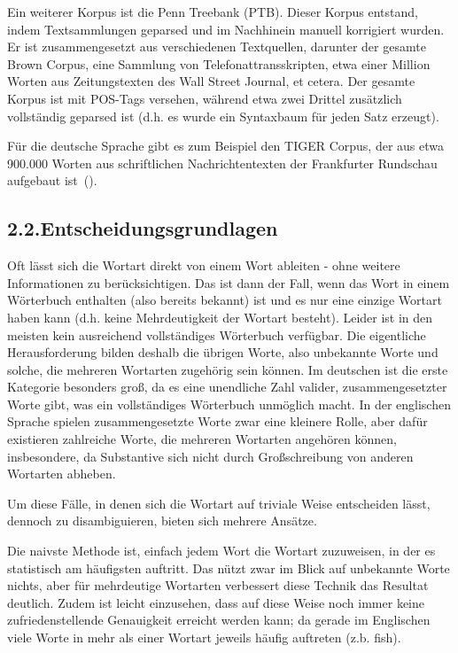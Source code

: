 \documentclass{article}
\begin{document}
Ein weiterer Korpus ist die Penn Treebank (PTB). Dieser Korpus entstand, indem Textsammlungen geparsed und im Nachhinein manuell korrigiert wurden. Er ist zusammengesetzt aus verschiedenen Textquellen, darunter der gesamte Brown Corpus, eine Sammlung von Telefonattransskripten, etwa einer Million Worten aus Zeitungstexten des Wall Street Journal, et cetera. Der gesamte Korpus ist mit POS-Tags versehen, während etwa zwei Drittel zusätzlich vollständig geparsed ist (d.h. es wurde ein Syntaxbaum für jeden Satz erzeugt).%

Für die deutsche Sprache gibt es zum Beispiel den TIGER Corpus, der aus etwa 900.000 Worten aus schriftlichen Nachrichtentexten der Frankfurter Rundschau aufgebaut ist~().%

\subsection{2.2.\hspace*{0.5em}Entscheidungsgrundlagen}\label{sec-entscheidungsgrundlagen}%

\noindent{}Oft lässt sich die Wortart direkt von einem Wort ableiten - ohne weitere Informationen zu berücksichtigen. Das ist dann der Fall, wenn das Wort in einem Wörterbuch enthalten (also bereits bekannt) ist und es nur eine einzige Wortart haben kann (d.h. keine Mehrdeutigkeit der Wortart besteht).
Leider ist in den meisten kein ausreichend vollständiges Wörterbuch verfügbar. Die eigentliche Herausforderung bilden deshalb die übrigen Worte, also unbekannte Worte und solche, die mehreren Wortarten zugehörig sein können. Im deutschen ist die erste Kategorie besonders groß, da es eine unendliche Zahl valider, zusammengesetzter Worte gibt, was ein vollständiges Wörterbuch unmöglich macht. In der englischen Sprache spielen zusammengesetzte Worte zwar eine kleinere Rolle, aber dafür existieren zahlreiche Worte, die mehreren Wortarten angehören können, insbesondere, da Substantive sich nicht durch Großschreibung von anderen Wortarten abheben.%

Um diese Fälle, in denen sich die Wortart auf triviale Weise entscheiden lässt, dennoch zu disambiguieren, bieten sich mehrere Ansätze.%

Die naivste Methode ist, einfach jedem Wort die Wortart zuzuweisen, in der es statistisch am häufigsten auftritt. Das nützt zwar im Blick auf unbekannte Worte nichts, aber für mehrdeutige Wortarten verbessert diese Technik das Resultat deutlich.
Zudem ist leicht einzusehen, dass auf diese Weise noch immer keine zufriedenstellende Genauigkeit erreicht werden kann; da gerade im Englischen viele Worte in mehr als einer Wortart jeweils häufig auftreten (z.b. fish).%
\end{document}

